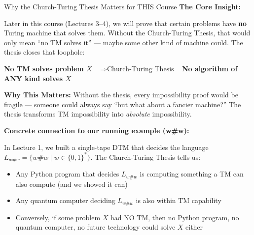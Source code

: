 \begin{conceptbox}{Why the Church-Turing Thesis Matters for THIS Course}
\textbf{The Core Insight:}

Later in this course (Lectures 3--4), we will prove that certain problems have
\textbf{no} Turing machine that solves them. Without the Church-Turing Thesis,
that would only mean ``no TM solves it'' --- maybe some other kind of machine
could. The thesis closes that loophole:

\begin{center}
\textbf{No TM solves problem $X$}
$\;\;\Rightarrow{\text{Church-Turing Thesis}}\;\;$
\textbf{No algorithm of ANY kind solves $X$}
\end{center}

\textbf{Why This Matters:}
Without the thesis, every impossibility proof would be fragile --- someone
could always say ``but what about a fancier machine?'' The thesis transforms
TM impossibility into \emph{absolute} impossibility.

\textbf{Concrete connection to our running example (w\#w):}

In Lecture 1, we built a single-tape DTM that decides the language
$L_{w\#w} = \{w\#w \mid w \in \{0,1\}^*\}$. The Church-Turing Thesis tells us:
\begin{itemize}[nosep]
\item Any Python program that decides $L_{w\#w}$ is computing something a TM
  can also compute (and we showed it can)
\item Any quantum computer deciding $L_{w\#w}$ is also within TM capability
\item Conversely, if some problem $X$ had NO TM, then no Python program, no
  quantum computer, no future technology could solve $X$ either
\end{itemize}

\end{conceptbox}

